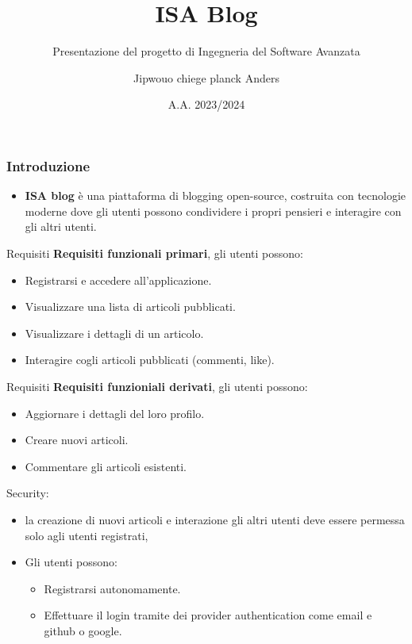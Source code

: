 \documentclass[8pt]{beamer}
\title{ISA Blog}
\subtitle{Presentazione del progetto di Ingegneria del Software Avanzata}
\author{Jipwouo chiege planck Anders}
\date{A.A. 2023/2024}
\begin{document}
\begin{frame}
    \titlepage
\end{frame}

\begin{frame}
    \frametitle{Introduzione}
    \begin{itemize}
        \item \textbf{ISA blog} è una piattaforma di blogging open-source, costruita con tecnologie moderne
        dove gli utenti possono condividere i propri pensieri e interagire con gli altri utenti.
    \end{itemize}
\end{frame}

\begin{frame}{Requisiti}
    \textbf{Requisiti funzionali primari}, gli utenti possono:
    \begin{itemize}
        \item Registrarsi e accedere all'applicazione.
        \item Visualizzare una lista di articoli pubblicati.
        \item Visualizzare i dettagli di un articolo.
        \item Interagire cogli articoli pubblicati (commenti, like).
    \end{itemize}
\end{frame}

\begin{frame}{Requisiti}
    \textbf{Requisiti funzioniali derivati}, gli utenti possono:
    \begin{itemize}
        \item Aggiornare i dettagli del loro profilo.
        \item Creare nuovi articoli.
        \item Commentare gli articoli esistenti.
      \end{itemize}
    Security:
    \begin{itemize}
        \item la creazione di nuovi articoli e interazione gli altri utenti deve essere permessa solo agli utenti registrati,
        \item Gli utenti possono:
              \begin{itemize}
                  \item Registrarsi autonomamente.
                  \item Effettuare il login tramite dei provider authentication come email e github o google.
              \end{itemize}
    \end{itemize}
\end{frame}
\end{document}
